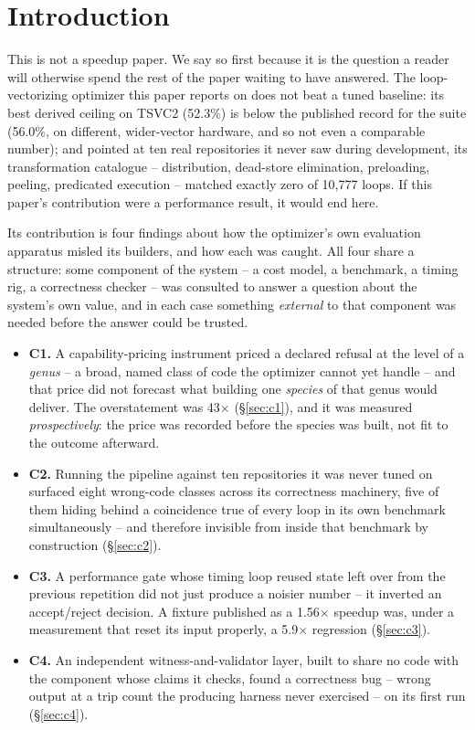 \documentclass[sigconf,review,anonymous]{acmart}
\begin{document}
\section{Introduction}

This is not a speedup paper. We say so first because it is the question a
reader will otherwise spend the rest of the paper waiting to have answered.
The loop-vectorizing optimizer this paper reports on does not beat a tuned
baseline: its best derived ceiling on TSVC2 (52.3\%) is below the published
record for the suite (56.0\%, on different, wider-vector hardware, and so not
even a comparable number); and pointed at ten real repositories it never saw
during development, its transformation catalogue -- distribution, dead-store
elimination, preloading, peeling, predicated execution -- matched exactly
zero of 10{,}777 loops. If this paper's contribution were a performance
result, it would end here.

Its contribution is four findings about how the optimizer's own evaluation
apparatus misled its builders, and how each was caught. All four share a
structure: some component of the system -- a cost model, a benchmark, a
timing rig, a correctness checker -- was consulted to answer a question
about the system's own value, and in each case something \emph{external} to
that component was needed before the answer could be trusted.

\begin{itemize}
\item \textbf{C1.} A capability-pricing instrument priced a declared
refusal at the level of a \emph{genus} -- a broad, named class of code the
optimizer cannot yet handle -- and that price did not forecast what building
one \emph{species} of that genus would deliver. The overstatement was
43$\times$ (\S\ref{sec:c1}), and it was measured \emph{prospectively}: the
price was recorded before the species was built, not fit to the outcome
afterward.
\item \textbf{C2.} Running the pipeline against ten repositories it was
never tuned on surfaced eight wrong-code classes across its correctness
machinery, five of them hiding behind a coincidence true of every loop in
its own benchmark simultaneously -- and therefore invisible from inside that
benchmark by construction (\S\ref{sec:c2}).
\item \textbf{C3.} A performance gate whose timing loop reused state left
over from the previous repetition did not just produce a noisier number --
it inverted an accept/reject decision. A fixture published as a
1.56$\times$ speedup was, under a measurement that reset its input properly,
a 5.9$\times$ regression (\S\ref{sec:c3}).
\item \textbf{C4.} An independent witness-and-validator layer, built to
share no code with the component whose claims it checks, found a
correctness bug -- wrong output at a trip count the producing harness never
exercised -- on its first run (\S\ref{sec:c4}).
\end{itemize}
\end{document}
